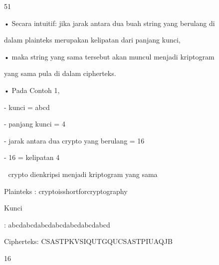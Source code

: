 \documentclass{article}
\begin{document}

51

• Secara intuitif: jika jarak antara dua buah string yang berulang di 

dalam plainteks merupakan kelipatan dari panjang kunci, 

• maka string yang sama tersebut akan muncul menjadi kriptogram 

yang sama pula di dalam cipherteks. 

• Pada Contoh 1, 


- kunci = abcd 


- panjang kunci = 4


- jarak antara dua crypto yang berulang = 16


- 16 = kelipatan 4

  crypto dienkripsi menjadi kriptogram yang sama

Plainteks   : cryptoisshortforcryptography

Kunci 

   : abcdabcdabcdabcdabcdabcdabcd

Cipherteks: CSASTPKVSIQUTGQUCSASTPIUAQJB 

16
\end{document}
